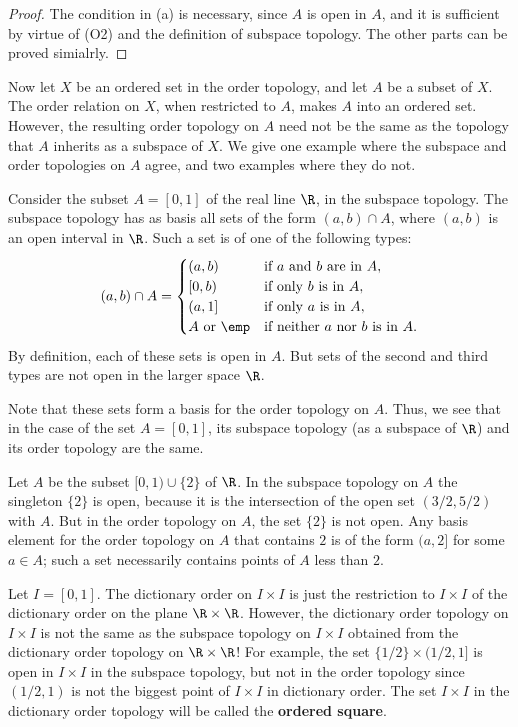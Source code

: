 \begin{proof}
The condition in (a) is necessary, since $A$ is open in $A$, and it is sufficient by virtue of (O2) and the definition of subspace topology. The other parts can be proved simialrly.
\end{proof}
Now let $X$ be an ordered set in the order topology, and let $A$ be a subset of $X$. The order relation on $X$, when restricted to $A$, makes $A$ into an ordered set. However, the resulting order topology on $A$ need not be the same as the topology that $A$ inherits as a subspace of $X$. We give one example where the subspace and order topologies on $A$ agree, and two examples where they do not.
\begin{example}
Consider the subset $A=[0,1]$ of the real line $\R$, in the subspace topology. The subspace topology has as basis all sets of the form $(a,b)\cap A$, where $(a,b)$ is an open interval in $\R$. Such a set is of one of the following types:
\[(a,b)\cap A=\begin{cases}
(a,b)&\text{if $a$ and $b$ are in $A$},\\
[0,b)&\text{if only $b$ is in $A$},\\
(a,1]&\text{if only $a$ is in $A$},\\
\text{$A$ or $\emp$}&\text{if neither $a$ nor $b$ is in $A$}.
\end{cases}\]
By definition, each of these sets is open in $A$. But sets of the second and third types are not open in the larger space $\R$.\par
Note that these sets form a basis for the order topology on $A$. Thus, we see that in the case of the set $A=[0,1]$, its subspace topology (as a subspace of $\R$) and its order topology are the same.
\end{example}
\begin{example}
Let $A$ be the subset $[0,1)\cup\{2\}$ of $\R$. In the subspace topology on $A$ the singleton $\{2\}$ is open, because it is the intersection of the open set $(3/2,5/2)$ with $A$. But in the order topology on $A$, the set $\{2\}$ is not open. Any basis element for the order topology on $A$ that contains $2$ is of the form $(a,2]$ for some $a\in A$; such a set necessarily contains points of $A$ less than $2$.
\end{example}
\begin{example}
Let $I=[0,1]$. The dictionary order on $I\times I$ is just the restriction to $I\times I$ of the dictionary order on the plane $\R\times\R$. However, the dictionary order topology on $I\times I$ is not the same as the subspace topology on $I\times I$ obtained from the dictionary order topology on $\R\times\R$! For example, the set $\{1/2\}\times(1/2,1]$ is open in $I\times I$ in the subspace topology, but not in the order topology since $(1/2,1)$ is not the biggest point of $I\times I$ in dictionary order. The set $I\times I$ in the dictionary order topology will be called the \textbf{ordered square}.
\end{example}
